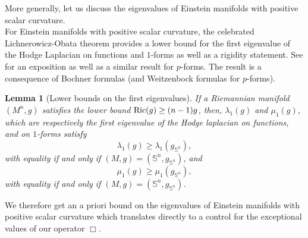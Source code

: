 \documentclass[a4paper,11pt,reqno]{amsart}
\newtheorem{lemma}[defn]{Lemma}
\def\Ric{\mathop{\rm Ric}\nolimits}
\def\Ric{\mathop{\rm Ric}\nolimits}
\numberwithin{equation}{section}
\begin{document}
	More generally, let us discuss the eigenvalues of Einstein manifolds with positive scalar curvature.\\
	
	For Einstein manifolds with positive scalar curvature, the celebrated Lichnerowicz-Obata theorem provides a lower bound for the first eigenvalue of the Hodge Laplacian on functions and $1$-forms as well as a rigidity statement. See \cite{Gal-Mey-Spec} for an exposition as well as a similar result for $p$-forms. The result is a consequence of Bochner formulas (and Weitzenbock formulas for $p$-forms).
	
	\begin{lemma}[Lower bounds on the first eigenvalues]\label{borne inf vp}
		If a Riemannian manifold $(M^n,g)$ satisfies the lower bound $\Ric(g)\geq (n-1)g$, then, $\lambda_1(g)$ and $\mu_1(g)$, which are respectively the first eigenvalue of the Hodge laplacian on functions, and on $1$-forms satisfy
		\begin{equation}
		\lambda_1(g)\geq \lambda_1(g_{\mathbb{S}^n}),
		\end{equation}
		with equality if and only if $(M,g) = (\mathbb{S}^n,g_{\mathbb{S}^n})$, and 
		\begin{equation}
		\mu_1(g)\geq \mu_1(g_{\mathbb{S}^n}),
		\end{equation}
		with equality if and only if $(M,g) = (\mathbb{S}^n,g_{\mathbb{S}^n})$.
	\end{lemma}
	
	We therefore get an a priori bound on the eigenvalues of Einstein manifolds with positive scalar curvature which translates directly to a control for the exceptional values of our operator $\Box$.
	
\end{document}
